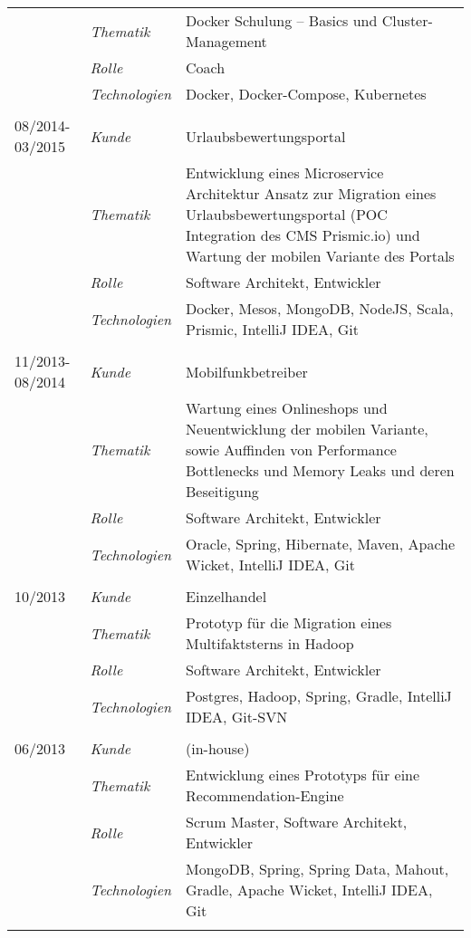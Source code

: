 \begin{longtable}{@{}>{}p{4cm}>{\itshape}p{2cm}>{}p{9cm}}
\nopagebreak		& Thematik	    & Docker Schulung – Basics und Cluster-Management\\
\nopagebreak		& Rolle 	    & Coach\\
\nopagebreak		& Technologien	& Docker, Docker-Compose, Kubernetes\\
\\
08/2014-03/2015     & Kunde 	    & Urlaubsbewertungsportal\\
\nopagebreak		& Thematik	    & Entwicklung eines Microservice Architektur Ansatz zur Migration eines Urlaubsbewertungsportal (POC Integration des CMS Prismic.io) und Wartung der mobilen Variante des Portals\\
\nopagebreak		& Rolle 	    & Software Architekt, Entwickler\\
\nopagebreak		& Technologien	& Docker, Mesos, MongoDB, NodeJS, Scala, Prismic, IntelliJ IDEA, Git\\
\\
11/2013-08/2014     & Kunde 	    & Mobilfunkbetreiber\\
\nopagebreak		& Thematik	    & Wartung eines Onlineshops und Neuentwicklung der mobilen Variante, sowie Auffinden von Performance Bottlenecks und Memory Leaks und deren Beseitigung\\
\nopagebreak		& Rolle 	    & Software Architekt, Entwickler\\
\nopagebreak		& Technologien	& Oracle, Spring, Hibernate, Maven, Apache Wicket, IntelliJ IDEA, Git\\
\\
10/2013             & Kunde 	    & Einzelhandel\\
\nopagebreak		& Thematik	    & Prototyp für die Migration eines Multifaktsterns in Hadoop\\
\nopagebreak		& Rolle 	    & Software Architekt, Entwickler\\
\nopagebreak		& Technologien	& Postgres, Hadoop, Spring, Gradle, IntelliJ IDEA, Git-SVN\\
\\
06/2013             & Kunde 	    & (in-house)\\
\nopagebreak		& Thematik	    & Entwicklung eines Prototyps für eine Recommendation-Engine\\
\nopagebreak		& Rolle 	    & Scrum Master, Software Architekt, Entwickler\\
\nopagebreak		& Technologien	& MongoDB, Spring, Spring Data, Mahout, Gradle, Apache Wicket, IntelliJ IDEA, Git\\
\\

\end{longtable}

